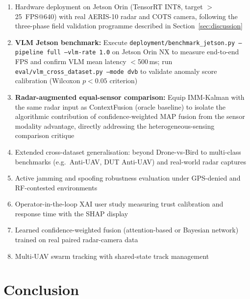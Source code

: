 \documentclass[drones,article,submit,pdftex]{Definitions/mdpi}
\begin{document}
\begin{enumerate}
  \item Hardware deployment on Jetson Orin (TensorRT INT8, target $>$25~FPS@640)
        with real AERIS-10 radar and COTS camera, following the three-phase
        field validation programme described in Section~\ref{sec:discussion}
  \item \textbf{VLM Jetson benchmark:} Execute \texttt{deployment/benchmark\_jetson.py
        --pipeline full --vlm-rate 1.0} on Jetson Orin NX to measure
        end-to-end FPS and confirm VLM mean latency $<$500\,ms;
        run \texttt{eval/vlm\_cross\_dataset.py --mode dvb} to validate
        anomaly score calibration (Wilcoxon $p < 0.05$ criterion)
  \item \textbf{Radar-augmented equal-sensor comparison:} Equip IMM-Kalman
        with the same radar input as ContextFusion (oracle baseline) to
        isolate the algorithmic contribution of confidence-weighted MAP fusion
        from the sensor modality advantage, directly addressing the
        heterogeneous-sensing comparison critique
  \item Extended cross-dataset generalisation: beyond Drone-vs-Bird to
        multi-class benchmarks (e.g.\ Anti-UAV, DUT Anti-UAV) and
        real-world radar captures
  \item Active jamming and spoofing robustness evaluation under
        GPS-denied and RF-contested environments
  \item Operator-in-the-loop XAI user study measuring trust calibration
        and response time with the SHAP display
  \item Learned confidence-weighted fusion (attention-based or Bayesian
        network) trained on real paired radar-camera data
  \item Multi-UAV swarm tracking with shared-state track management
\end{enumerate}

\section{Conclusion}
\label{sec:conclusion}
\end{document}
